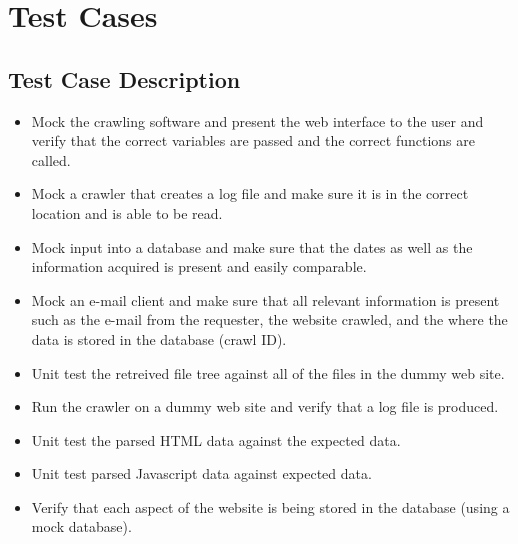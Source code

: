 \section{Test Cases}
\subsection{Test Case Description}
\begin{itemize}
    \item Mock the crawling software and present the web interface to the user and verify that the correct variables are passed and the correct functions are called.
    \item Mock a crawler that creates a log file and make sure it is in the correct location and is able to be read.
    \item Mock input into a database and make sure that the dates as well as the information acquired is present and easily comparable.
    \item Mock an e-mail client and make sure that all relevant information is present such as the e-mail from the requester, the website crawled, and the where the data is stored in the database (crawl ID).
    \item Unit test the retreived file tree against all of the files in the dummy web site.
    \item Run the crawler on a dummy web site and verify that a log file is produced.
    \item Unit test the parsed HTML data against the expected data.
    \item Unit test parsed Javascript data against expected data.
    \item Verify that each aspect of the website is being stored in the database (using a mock database).
\end{itemize}

